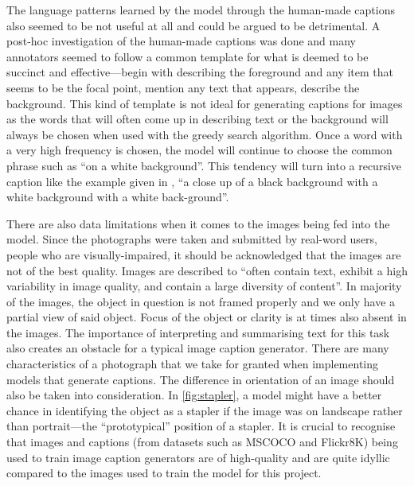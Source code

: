 \documentclass[11pt,a4paper]{article}
\begin{document}
The language patterns learned by the model through the human-made captions also seemed to be not useful at all and could be argued to be detrimental. A post-hoc investigation of the human-made captions was done and many annotators seemed to follow a common template for what is deemed to be succinct and effective—begin with describing the foreground and any item that seems to be the focal point, mention any text that appears, describe the background. This kind of template is not ideal for generating captions for images as the words that will often come up in describing text or the background will always be chosen when used with the greedy search algorithm. Once a word with a very high frequency is chosen, the model will continue to choose the common phrase such as “on a white background”. This tendency will turn into a recursive caption like the example given in , “a close up of a black background with a white background with a white back-ground”. 

There are also data limitations when it comes to the images being fed into the model. Since the photographs were taken and submitted by real-word users, people who are visually-impaired, it should be acknowledged that the images are not of the best quality. Images are described to “often contain text, exhibit a high variability in image quality, and contain a large diversity of content”. \citep{Gurari-2020-captioning} In majority of the images, the object in question is not framed properly and we only have a partial view of said object. Focus of the object or clarity is at times also absent in the images. The importance of interpreting and summarising text for this task also creates an obstacle for a typical image caption generator. There are many characteristics of a photograph that we take for granted when implementing models that generate captions. The difference in orientation of an image should also be taken into consideration. In \autoref{fig:stapler}, a model might have a better chance in identifying the object as a stapler if the image was on landscape rather than portrait—the “prototypical” position of a stapler. It is crucial to recognise that images and captions (from datasets such as MSCOCO and Flickr8K) being used to train image caption generators are of high-quality and are quite idyllic compared to the images used to train the model for this project. 
\end{document}
